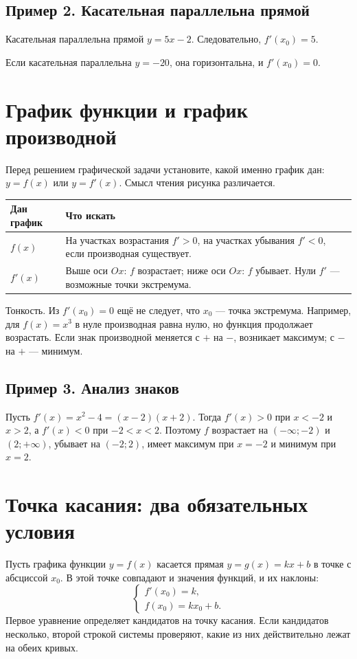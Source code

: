 \documentclass[a4paper,12pt]{article}
\newcommand{\key}[1]{\textcolor{darkaccent}{#1}}
\begin{document}
\subsection{Пример 2. Касательная параллельна прямой}
Касательная параллельна прямой $y=5x-2$. Следовательно, $f'(x_0)=5$.

Если касательная параллельна $y=-20$, она горизонтальна, и $f'(x_0)=0$.

\section{График функции и график производной}
Перед решением графической задачи установите, \key{какой именно график дан}: $y=f(x)$ или $y=f'(x)$. Смысл чтения рисунка различается.

\begin{center}
\begin{tabularx}{\linewidth}{@{}>{\raggedright\arraybackslash}p{.25\linewidth}X@{}}
\toprule
\textbf{Дан график} & \textbf{Что искать}\\
\midrule
$f(x)$ & На участках возрастания $f'>0$, на участках убывания $f'<0$, если производная существует.\\
$f'(x)$ & Выше оси $Ox$: $f$ возрастает; ниже оси $Ox$: $f$ убывает. Нули $f'$ --- возможные точки экстремума.\\
\bottomrule
\end{tabularx}
\end{center}

\key{Тонкость.} Из $f'(x_0)=0$ ещё не следует, что $x_0$ --- точка экстремума. Например, для $f(x)=x^3$ в нуле производная равна нулю, но функция продолжает возрастать. Если знак производной меняется с $+$ на $-$, возникает максимум; с $-$ на $+$ --- минимум.

\subsection{Пример 3. Анализ знаков}
Пусть $f'(x)=x^2-4=(x-2)(x+2)$. Тогда $f'(x)>0$ при $x<-2$ и $x>2$, а $f'(x)<0$ при $-2<x<2$. Поэтому $f$ возрастает на $(-\infty;-2)$ и $(2;+\infty)$, убывает на $(-2;2)$, имеет максимум при $x=-2$ и минимум при $x=2$.

\section{Точка касания: два обязательных условия}
Пусть графика функции $y=f(x)$ касается прямая $y=g(x)=kx+b$ в точке с абсциссой $x_0$. В этой точке совпадают и значения функций, и их наклоны:
\[
\boxed{\begin{cases}
f'(x_0)=k,\\
f(x_0)=kx_0+b.
\end{cases}}
\]
Первое уравнение определяет \key{кандидатов} на точку касания. Если кандидатов несколько, второй строкой системы проверяют, какие из них действительно лежат на обеих кривых.
\end{document}
